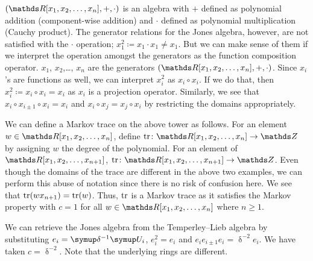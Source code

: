 \((\R[x_1, x_2, \ldots, x_n], +, \cdot)\) is an algebra with \(+\) defined as polynomial addition (component-wise addition) and \(\cdot\) defined as  polynomial multiplication (Cauchy product). The generator relations for the Jones algebra, however, are not satisfied with the \(\cdot\) operation; \(x_1^2 \coloneq x_1 \cdot x_1 \neq x_1\). But we can make sense of them if we interpret the operation amongst the generators as the function composition operator. \(x_1\), \(x_2\),\ldots, \(x_n\) are the generators \((\R[x_1, x_2, \ldots, x_n], +, \cdot)\). Since \(x_i\)'s are functions as well, we can interpret \(x_i^2\) as \(x_i \circ x_i\). If we do that, then \(x_i^2 \coloneq x_i \circ x_i = x_i\) as \(x_i\) is a projection operator. Similarly, we see that \(x_i \circ x_{i\pm 1}\circ x_i = x_i\) and \(x_i \circ x_j = x_j \circ x_i\) by restricting the domains appropriately.

We can define a Markov trace on the above tower as follows. For an element \(w \in \R[x_1, x_2, \ldots, x_{n}]\), define \(\tr \colon \R[x_1, x_2, \ldots, x_{n}] \rightarrow \Z\) by assigning \(w\) the degree of the polynomial. For an element of \(\R[x_1, x_2, \ldots, x_{n+1}]\), \(\tr \colon \R[x_1, x_2, \ldots, x_{n+1}] \rightarrow \Z\). Even though the domains of the trace are different in the above two examples, we can perform this abuse of notation since there is no risk of confusion here. We see that \(\operatorname{tr}(w x_{n+1}) = \operatorname{tr}(w)\). Thus, \(\operatorname{tr}\) is a Markov trace as it satisfies the Markov property with \(c=1\) for all \(w \in \R[x_1, x_2, \ldots, x_{n}]\) where \(n \geq 1\).

We can retrieve the Jones algebra from the Temperley--Lieb algebra by substituting \(e_i = \updelta^{-1} \U_i\), \(e_i^2 = e_i\) and \(e_ie_{i\pm 1} e_i = \updelta^{-2}e_i\). We have taken \(c = \updelta^{-2}\). Note that the underlying rings are different.

